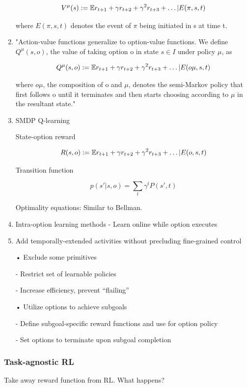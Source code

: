 \documentclass[english]{article}
\begin{document}
\begin{enumerate}
$$
V^\mu(s)
:= \mathbb{E} r_{t+1} +\gamma r_{t+2} +
\gamma^2 r_{t+3} 
+\ldots | E(\pi,s,t)$$ 

where $E(\pi,s,t)$ denotes the event of $\pi$ being initiated in s at time t.

\item "Action-value functions
generalize to option-value functions. We define $Q^\mu(s,o)$, the value of taking option o
in state $s \in I$ under policy $\mu$, as

$$
Q^\mu(s,o)
:= \mathbb{E} r_{t+1} +\gamma r_{t+2} +
\gamma^2 r_{t+3} 
+\ldots | E(o\mu,s,t)$$ 

where $o\mu$, the composition of o and $\mu$, denotes the semi-Markov policy that first follows
o until it terminates and then starts choosing according to $\mu$ in the resultant state." 



\item  SMDP Q-learning

State-option reward

$$
R(s,o)
:= \mathbb{E} r_{t+1} +\gamma r_{t+2} +
\gamma^2 r_{t+3} 
+\ldots | E(o,s,t)$$ 

Transition function

$$p(s'|s,o) 
= 
\sum_{t} \gamma^t 
P(s',t)$$

Optimality equations: Similar to Bellman.

\item Intra-option learning methods
- Learn online while option executes

\item  Add temporally-extended activities without
precluding fine-grained control

• Exclude some primitives

- Restrict set of learnable policies

- Increase efficiency, prevent “flailing”

• Utilize options to achieve subgoals

- Define subgoal-specific reward functions and use for
option policy

- Set options to terminate upon subgoal completion

\end{enumerate}


\eenum 

\subsubsection{Task-agnostic RL}
%
\benum
\item Take away reward function from RL. What happens?
\end{document}
